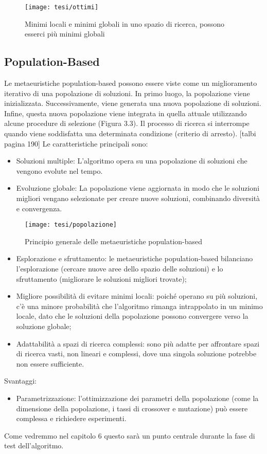 \begin{figure}[h!] 
    \centering 
    \texttt{[image: tesi/ottimi]} 
    \caption{Minimi locali e minimi globali in uno spazio di ricerca, possono esserci più minimi globali}
\end{figure}

\subsection{Population-Based}

Le metaeuristiche population-based possono essere viste come un miglioramento iterativo di una popolazione di soluzioni. In primo luogo, la popolazione viene inizializzata. Successivamente, viene generata una nuova popolazione di soluzioni. Infine, questa nuova popolazione viene integrata in quella attuale utilizzando alcune procedure di selezione (Figura 3.3). Il processo di ricerca si interrompe quando viene soddisfatta una determinata condizione (criterio di arresto). [talbi pagina 190] Le caratteristiche principali sono:
\begin{itemize}
    \item Soluzioni multiple: L'algoritmo opera su una popolazione di soluzioni che vengono evolute nel tempo.
    \item Evoluzione globale: La popolazione viene aggiornata in modo che le soluzioni migliori vengano selezionate per creare nuove soluzioni, combinando diversità e convergenza.
\end{itemize}

\begin{figure}[h!] 
    \centering 
    \texttt{[image: tesi/popolazione]} 
    \caption{Principio generale delle metaeuristiche population-based}
\end{figure}

\begin{itemize}
    \item Esplorazione e sfruttamento: le metaeuristiche population-based bilanciano l’esplorazione (cercare nuove aree dello spazio delle soluzioni) e lo sfruttamento (migliorare le soluzioni migliori trovate);
    \item Migliore possibilità di evitare minimi locali: poiché operano su più soluzioni, c'è una minore probabilità che l'algoritmo rimanga intrappolato in un minimo locale, dato che le soluzioni della popolazione possono convergere verso la soluzione globale;
    \item Adattabilità a spazi di ricerca complessi: sono più adatte per affrontare spazi di ricerca vasti, non lineari e complessi, dove una singola soluzione potrebbe non essere sufficiente.
\end{itemize}
Svantaggi:
\begin{itemize}
    \item Parametrizzazione: l'ottimizzazione dei parametri della popolazione (come la dimensione della popolazione, i tassi di crossover e mutazione) può essere complessa e richiedere esperimenti.
\end{itemize}
Come vedremmo nel capitolo 6 questo sarà un punto centrale durante la fase di test dell'algoritmo.

